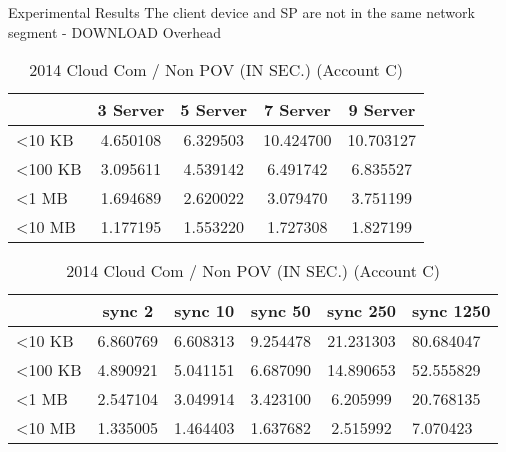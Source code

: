 \begin{frame}{Experimental Results}
{The client device and SP are \alert{not} in the same network segment - DOWNLOAD Overhead}
	\scriptsize
    \begin{table}[]
    \centering
    \caption{My Method / Non POV (IN SEC.) (Account C)}
    \begin{tabular}{lcccc}
                         & 3 Server & 5 Server & 7 Server  & 9 Server  \\ \hline
        \textless 10 KB  & 4.650108 & 6.329503 & 10.424700 & 10.703127 \\ \hline
        \textless 100 KB & 3.095611 & 4.539142 & 6.491742  & 6.835527  \\ \hline
        \textless 1 MB   & 1.694689 & 2.620022 & 3.079470  & 3.751199  \\ \hline
        \textless 10 MB  & 1.177195 & 1.553220 & 1.727308  & 1.827199  \\ \hline
    \end{tabular}
    \caption{2014 Cloud Com / Non POV (IN SEC.) (Account C)}
    \begin{tabular}{lccccl}
                         & sync 2   & sync 10  & sync 50  & sync 250  & sync 1250 \\ \hline
        \textless 10 KB  & 6.860769 & 6.608313 & 9.254478 & 21.231303 & 80.684047 \\ \hline
        \textless 100 KB & 4.890921 & 5.041151 & 6.687090 & 14.890653 & 52.555829 \\ \hline
        \textless 1 MB   & 2.547104 & 3.049914 & 3.423100 & 6.205999  & 20.768135 \\ \hline
        \textless 10 MB  & 1.335005 & 1.464403 & 1.637682 & 2.515992  & 7.070423  \\ \hline
    \end{tabular}
    \end{table}
\end{frame}